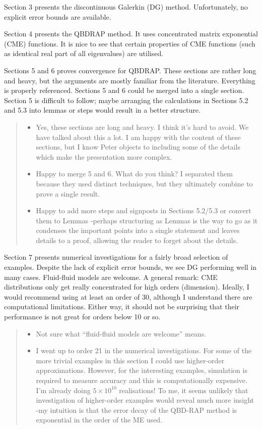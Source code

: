 \documentclass[a4paper]{article}
\begin{document}
Section 3 presents the discontinuous Galerkin (DG) method. Unfortunately, no explicit error bounds are available.

Section 4 presents the QBDRAP method. It uses concentrated matrix exponential (CME) functions. It is nice to see that certain properties of CME functions (such as identical real part of all eigenvalues) are utilised. 

Sections 5 and 6 proves convergence for QBDRAP. These sections are rather long and heavy, but the arguments are mostly familiar from the literature. Everything is properly referenced. Sections 5 and 6 could be merged into a single section. Section 5 is difficult to follow; maybe arranging the calculations in Sections 5.2 and 5.3 into lemmas or steps would result in a better structure.
\begin{quote}
    \begin{itemize}
        \item Yes, these sections are long and heavy. I think it's hard to avoid. We have talked about this a lot. I am happy with the content of these sections, but I know Peter objects to including some of the details which make the presentation more complex. 
        \item Happy to merge 5 and 6. What do you think? I separated them because they used distinct techniques, but they ultimately combine to prove a single result. 
        \item Happy to add more steps and signposts in Sections 5.2/5.3 or convert them to Lemmas -perhaps structuring as Lemmas is the way to go as it condenses the important points into a single statement and leaves details to a proof, allowing the reader to forget about the details.
    \end{itemize}
\end{quote}

Section 7 presents numerical investigations for a fairly broad selection of examples. Despite the lack of explicit error bounds, we see DG performing well in many cases. Fluid-fluid models are welcome. A general remark: CME distributions only get really concentrated for high orders (dimension). Ideally, I would recommend using at least an order of 30, although I understand there are computational limitations. Either way, it should not be surprising that their performance is not great for orders below 10 or so.
\begin{quote}
    \begin{itemize}
        \item   Not sure what ``fluid-fluid models are welcome'' means.
        \item I went up to order 21 in the numerical investigations. For some of the more trivial examples in this section I could use higher-order approximations. However, for the interesting examples, simulation is required to measure accuracy and this is computationally expensive. I'm already doing \(5\times 10^{10}\) realisations! To me, it seems unlikely that investigation of higher-order examples would reveal much more insight -my intuition is that the error decay of the QBD-RAP method is exponential in the order of the ME used. 
    \end{itemize}
\end{quote}
\end{document}
